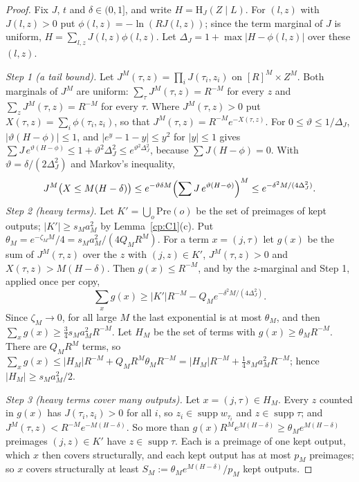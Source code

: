\documentclass[11pt]{article}
\theoremstyle{definition}
\theoremstyle{remark}
\newcommand{\abs}[1]{\lvert #1\rvert}
\newcommand{\Ent}{\mathrm{H}}                 %
\DeclareMathOperator{\supp}{supp}
\newcommand{\Pre}{\mathrm{Pre}}              %
\begin{document}
\begin{proof}
Fix $J$, $t$ and $\delta\in(0,1]$, and write $H=\Ent_J(Z\mid L)$. For $(l,z)$ with $J(l,z)>0$ put $\phi(l,z)=-\ln(RJ(l,z))$; since the term marginal of $J$ is uniform, $H=\sum_{l,z}J(l,z)\phi(l,z)$. Let $\Delta_J=1+\max\abs{H-\phi(l,z)}$ over these $(l,z)$.

\emph{Step 1 (a tail bound).} Let $J^M(\tau,z)=\prod_iJ(\tau_i,z_i)$ on $[R]^M\times Z^M$. Both marginals of $J^M$ are uniform: $\sum_\tau J^M(\tau,z)=R^{-M}$ for every $z$ and $\sum_zJ^M(\tau,z)=R^{-M}$ for every $\tau$. Where $J^M(\tau,z)>0$ put $X(\tau,z)=\sum_i\phi(\tau_i,z_i)$, so that $J^M(\tau,z)=R^{-M}e^{-X(\tau,z)}$. For $0\le\vartheta\le1/\Delta_J$, $\abs{\vartheta(H-\phi)}\le1$, and $\abs{e^y-1-y}\le y^2$ for $\abs y\le1$ gives $\sum J\,e^{\vartheta(H-\phi)}\le1+\vartheta^2\Delta_J^2\le e^{\vartheta^2\Delta_J^2}$, because $\sum J(H-\phi)=0$. With $\vartheta=\delta/(2\Delta_J^2)$ and Markov's inequality,
\[
J^M\bigl(X\le M(H-\delta)\bigr)\le e^{-\vartheta\delta M}\Bigl(\sum J\,e^{\vartheta(H-\phi)}\Bigr)^M\le e^{-\delta^2M/(4\Delta_J^2)}.
\]
\emph{Step 2 (heavy terms).} Let $K'=\bigcup_o\Pre(o)$ be the set of preimages of kept outputs; $\abs{K'}\ge s_Ma_M^2$ by Lemma~\ref{cp:C1}(c). Put $\theta_M=e^{-\zeta_MM}/4=s_Ma_M^2/(4Q_MR^M)$. For a term $x=(j,\tau)$ let $g(x)$ be the sum of $J^M(\tau,z)$ over the $z$ with $(j,z)\in K'$, $J^M(\tau,z)>0$ and $X(\tau,z)>M(H-\delta)$. Then $g(x)\le R^{-M}$, and by the $z$-marginal and Step 1, applied once per copy,
\[
\sum_xg(x)\ge\abs{K'}R^{-M}-Q_Me^{-\delta^2M/(4\Delta_J^2)}.
\]
Since $\zeta_M\to0$, for all large $M$ the last exponential is at most $\theta_M$, and then $\sum_xg(x)\ge\frac34s_Ma_M^2R^{-M}$. Let $H_M$ be the set of terms with $g(x)\ge\theta_MR^{-M}$. There are $Q_MR^M$ terms, so $\sum_xg(x)\le\abs{H_M}R^{-M}+Q_MR^M\theta_MR^{-M}=\abs{H_M}R^{-M}+\frac14s_Ma_M^2R^{-M}$; hence $\abs{H_M}\ge s_Ma_M^2/2$.

\emph{Step 3 (heavy terms cover many outputs).} Let $x=(j,\tau)\in H_M$. Every $z$ counted in $g(x)$ has $J(\tau_i,z_i)>0$ for all $i$, so $z_i\in\supp w_{\tau_i}$ and $z\in\supp\tau$; and $J^M(\tau,z)<R^{-M}e^{-M(H-\delta)}$. So more than $g(x)R^Me^{M(H-\delta)}\ge\theta_Me^{M(H-\delta)}$ preimages $(j,z)\in K'$ have $z\in\supp\tau$. Each is a preimage of one kept output, which $x$ then covers structurally, and each kept output has at most $p_M$ preimages; so $x$ covers structurally at least $S_M:=\theta_Me^{M(H-\delta)}/p_M$ kept outputs.


\end{proof}
\end{document}
